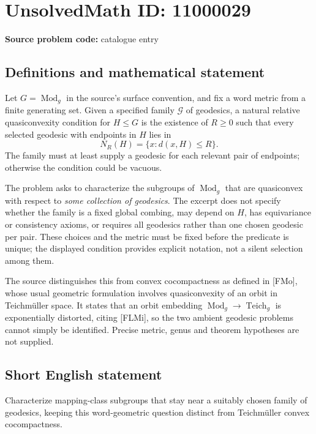 \documentclass[11pt]{article}
\begin{document}
\section*{UnsolvedMath ID: 11000029}
\textbf{Source problem code:} catalogue entry
\subsection{Definitions and mathematical statement}
Let \(G=\operatorname{Mod}_g\) in the source's surface convention, and fix a word metric from a finite generating set. Given a specified family \(\mathscr G\) of geodesics, a natural relative quasiconvexity condition for \(H\leq G\) is the existence of \(R\geq0\) such that every selected geodesic with endpoints in \(H\) lies in
\[
 N_R(H)=\{x:d(x,H)\leq R\}.
\]
The family must at least supply a geodesic for each relevant pair of endpoints; otherwise the condition could be vacuous.

The problem asks to characterize the subgroups of \(\operatorname{Mod}_g\) that are quasiconvex with respect to \emph{some collection of geodesics}. The excerpt does not specify whether the family is a fixed global combing, may depend on \(H\), has equivariance or consistency axioms, or requires all geodesics rather than one chosen geodesic per pair. These choices and the metric must be fixed before the predicate is unique; the displayed condition provides explicit notation, not a silent selection among them.

The source distinguishes this from convex cocompactness as defined in [FMo], whose usual geometric formulation involves quasiconvexity of an orbit in Teichm\"uller space. It states that an orbit embedding \(\operatorname{Mod}_g\to\operatorname{Teich}_g\) is exponentially distorted, citing [FLMi], so the two ambient geodesic problems cannot simply be identified. Precise metric, genus and theorem hypotheses are not supplied.
\subsection{Short English statement}
Characterize mapping-class subgroups that stay near a suitably chosen family of geodesics, keeping this word-geometric question distinct from Teichm\"uller convex cocompactness.
\end{document}
